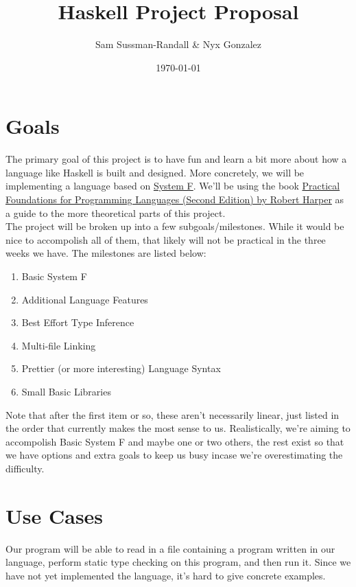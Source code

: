 \documentclass[a4paper,12pt]{article}
\begin{document}
\title{Haskell Project Proposal}
\author{Sam Sussman-Randall \& Nyx Gonzalez}
\date{\today}
\maketitle

\section{Goals}

The primary goal of this project is to have fun and learn a bit more about how a language like Haskell is built and designed. More concretely, we will be implementing a language based on \href{https://en.wikipedia.org/wiki/System_F}{System F}. We'll be using the book \href{https://www.cambridge.org/us/universitypress/subjects/computer-science/programming-languages-and-applied-logic/practical-foundations-programming-languages-2nd-edition?format=HB}{Practical Foundations for Programming Languages (Second Edition) by Robert Harper} as a guide to the more theoretical parts of this project.\\

The project will be broken up into a few subgoals/milestones. While it would be nice to accompolish all of them, that likely will not be practical in the three weeks we have. The milestones are listed below:
\begin{enumerate}
    \item Basic System F
    \item Additional Language Features
    \item Best Effort Type Inference
    \item Multi-file Linking
    \item Prettier (or more interesting) Language Syntax
    \item Small Basic Libraries
\end{enumerate}
Note that after the first item or so, these aren't necessarily linear, just listed in the order that currently makes the most sense to us. Realistically, we're aiming to accompolish Basic System F and maybe one or two others, the rest exist so that we have options and extra goals to keep us busy incase we're overestimating the difficulty.

\section{Use Cases}

Our program will be able to read in a file containing a program written in our language, perform static type checking on this program, and then run it. Since we have not yet implemented the language, it's hard to give concrete examples. 
\end{document}
